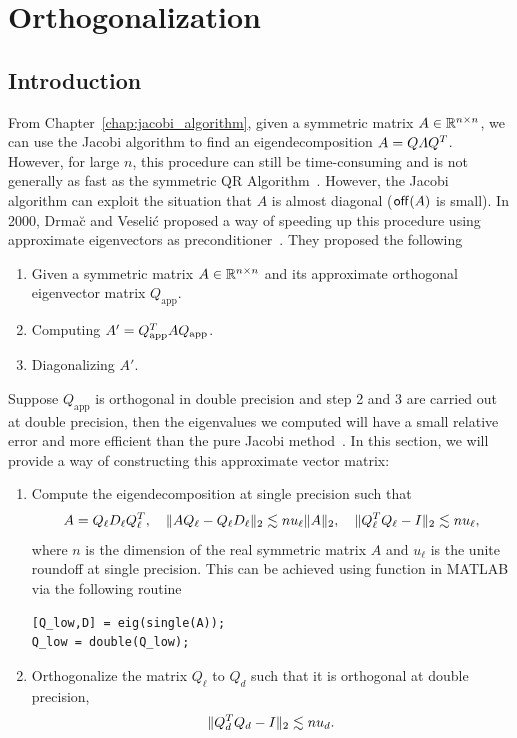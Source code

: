 \chapter{Orthogonalization}\label{chap:orthogonalisation}

\section{Introduction}\label{sec.approx-eig}

From Chapter~\ref{chap:jacobi_algorithm}, given a symmetric matrix $A\in\mathbb{R}^{n\times n}$, we can use the Jacobi algorithm to find an eigendecomposition $A = Q\varLambda Q^T$. However, for large $n$, this procedure can still be time-consuming and is not generally as fast as the symmetric QR Algorithm~. However, the Jacobi algorithm can exploit the situation that $A$ is almost diagonal ($\mathsf{off}(A)$ is small). In 2000, Drma\u c and Veseli\'c proposed a way of speeding up this procedure using approximate eigenvectors as preconditioner~. They proposed the following
\begin{enumerate}
  \item Given a symmetric matrix $A\in\mathbb{R}^{n\times n}$ and its approximate orthogonal eigenvector matrix $Q_{\text{app}}$.
  \item Computing $A' = Q_{\text{app}}^T A Q_{\text{app}}$.
  \item Diagonalizing $A'$.
\end{enumerate}
Suppose $Q_{\text{app}}$ is orthogonal in double precision and step 2 and 3 are carried out at double precision, then the eigenvalues we computed will have a small relative error and more efficient than the pure Jacobi method~. In this section, we will provide a way of constructing this approximate vector matrix:
\begin{enumerate}
  \item Compute the eigendecomposition at single precision such that 
  \begin{equation}\notag
    A = Q_\ell D_\ell Q_\ell^T, \quad \|{AQ_\ell - Q_\ell D_\ell}\|_2 \lesssim nu_\ell \|{A}\|_2,\quad \|{Q_\ell ^T Q_\ell - I}\|_2 \lesssim nu_\ell,
  \end{equation}
  where $n$ is the dimension of the real symmetric matrix $A$ and $u_\ell$ is the unite roundoff at single precision. This can be achieved using  function in MATLAB via the following routine 
\begin{lstlisting}
[Q_low,D] = eig(single(A));
Q_low = double(Q_low);
\end{lstlisting}
  \item Orthogonalize the matrix $Q_\ell$ to $Q_d$ such that it is orthogonal at double precision,
  \begin{equation}\notag
    \|{Q_d^T Q_d - I}\|_2 \lesssim nu_d.
  \end{equation}
\end{enumerate}

